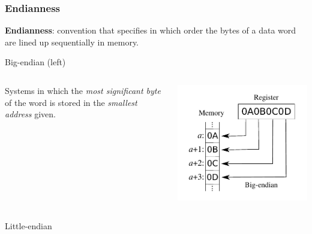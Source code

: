 \documentclass[]{beamer}
\begin{document}
\begin{frame}
  \frametitle{Endianness}
  \textbf{Endianness}: convention that specifies in which order the bytes of a data word are lined up sequentially in memory.
  \begin{block}{Big-endian (left)}
  \begin{columns}
    \begin{column}{0.6\textwidth}
      Systems in which the \emph{most significant byte} of the word is stored in the \emph{smallest address} given.
    \end{column}
    \begin{column}{0.25\textwidth}
      \includegraphics[width=\textwidth]{images/Big-Endian.pdf}
    \end{column}
  \end{columns}
  \end{block}
    \begin{block}{Little-endian}
  \begin{columns}
    \begin{column}{0.25\columnwidth}

\end{column}
\end{columns}
\end{block}
\end{frame}
\end{document}
